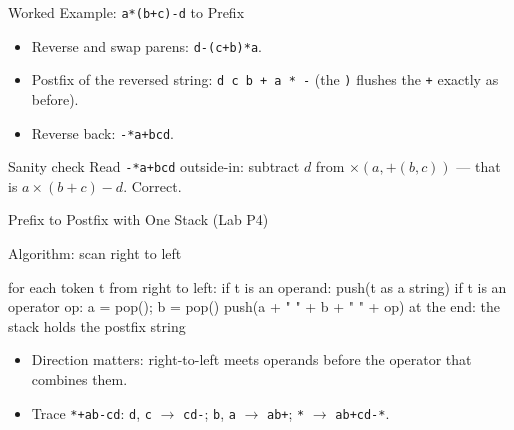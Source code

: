 \documentclass[aspectratio=169]{beamer}
\begin{document}
\begin{frame}{Worked Example: \texttt{a*(b+c)-d} to Prefix}
  \begin{itemize}
    \item Reverse and swap parens: \texttt{d-(c+b)*a}.
    \item Postfix of the reversed string: \texttt{d c b + a * -}
      (the \texttt{)} flushes the \texttt{+} exactly as before).
    \item Reverse back: \texttt{-*a+bcd}.
  \end{itemize}
  \begin{exampleblock}{Sanity check}
    Read \texttt{-*a+bcd} outside-in: subtract $d$ from $\times(a, +(b,c))$
    --- that is $a \times (b+c) - d$. Correct.
  \end{exampleblock}
\end{frame}

\begin{frame}[fragile]{Prefix to Postfix with One Stack (Lab P4)}
  \begin{block}{Algorithm: scan right to left}
\begin{semiverbatim}
for each token t from right to left:
    if t is an operand: push(t as a string)
    if t is an operator op:
        a = pop(); b = pop()
        push(a + " " + b + " " + op)
at the end: the stack holds the postfix string
\end{semiverbatim}
  \end{block}
  \begin{itemize}
    \item Direction matters: right-to-left meets operands before the operator
      that combines them.
    \item Trace \texttt{*+ab-cd}: \texttt{d}, \texttt{c} $\to$ \texttt{cd-};
      \texttt{b}, \texttt{a} $\to$ \texttt{ab+}; \texttt{*} $\to$
      \texttt{ab+cd-*}.
  \end{itemize}
\end{frame}
\end{document}

